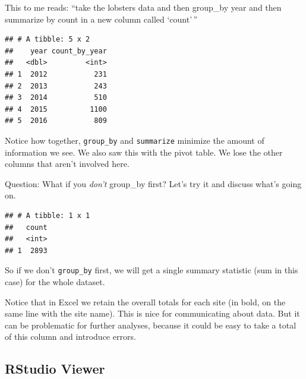 \documentclass[]{book}
\newenvironment{Shaded}{\begin{snugshade}}{\end{snugshade}}
\newcommand{\DataTypeTok}[1]{\textcolor[rgb]{0.13,0.29,0.53}{#1}}
\newcommand{\KeywordTok}[1]{\textcolor[rgb]{0.13,0.29,0.53}{\textbf{#1}}}
\newcommand{\NormalTok}[1]{#1}
\newcommand{\OperatorTok}[1]{\textcolor[rgb]{0.81,0.36,0.00}{\textbf{#1}}}
\newcommand{\StringTok}[1]{\textcolor[rgb]{0.31,0.60,0.02}{#1}}
\begin{document}
This to me reads: ``take the lobsters data and then group\_by year and then summarize by count in a new column called `count'\,''

\begin{Shaded}
\end{Shaded}

\begin{verbatim}
## # A tibble: 5 x 2
##    year count_by_year
##   <dbl>         <int>
## 1  2012           231
## 2  2013           243
## 3  2014           510
## 4  2015          1100
## 5  2016           809
\end{verbatim}

Notice how together, \texttt{group\_by} and \texttt{summarize} minimize the amount of information we see. We also saw this with the pivot table. We lose the other columns that aren't involved here.

Question: What if you \emph{don't} group\_by first? Let's try it and discuss what's going on.

\begin{Shaded}
\end{Shaded}

\begin{verbatim}
## # A tibble: 1 x 1
##   count
##   <int>
## 1  2893
\end{verbatim}

So if we don't \texttt{group\_by} first, we will get a single summary statistic (sum in this case) for the whole dataset.

Notice that in Excel we retain the overall totals for each site (in bold, on the same line with the site name). This is nice for communicating about data. But it can be problematic for further analyses, because it could be easy to take a total of this column and introduce errors.

\hypertarget{rstudio-viewer}{%
\subsection{RStudio Viewer}\label{rstudio-viewer}}
\end{document}
